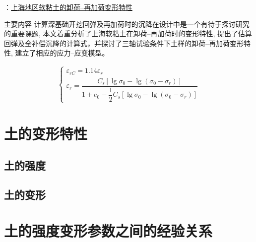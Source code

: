 \begin{frame}{\citet{Chen1990}：\href{run:./papers/Chen1990-上海地区软粘土的卸荷—再加荷变形特性.pdf}{上海地区软粘土的卸荷--再加荷变形特性}}
    \begin{block}{主要内容}
        计算深基础开挖回弹及再加荷时的沉降在设计中是一个有待于探讨研究的重要课题, 本文着重分析了上海软粘土在卸荷--再加荷时的变形特性, 提出了估算回弹及全补偿沉降的计算式，并探讨了三轴试验条件下土样的卸荷--再加荷变形特性, 建立了相应的应力--应变模型。

        \vspace{-5mm}
        \begin{align}
            \begin{cases}
                \varepsilon_{rC}=1.14\varepsilon_r \\[2mm]
                \varepsilon_r=\dfrac{C_s\left[\lg\sigma_0-\lg(\sigma_0-\sigma_r)\right]}{1+e_0-\dfrac{1}{2}C_s\left[\lg\sigma_0-\lg(\sigma_0-\sigma_r)\right]}
            \end{cases}
        \end{align}
    \end{block}
\end{frame}

\section{土的变形特性}

\subsection{土的强度}

\subsection{土的变形}

\section{土的强度变形参数之间的经验关系}

    

